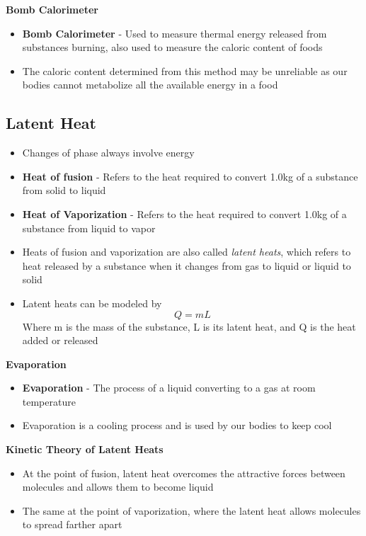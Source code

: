 \textbf{Bomb Calorimeter}
\begin{itemize}
    \item \textbf{Bomb Calorimeter} - Used to measure thermal energy released from substances burning, also used to measure the caloric content of foods
    \item The caloric content determined from this method may be unreliable as our bodies cannot metabolize all the available energy in a food
\end{itemize}

\subsection{Latent Heat}
\begin{itemize}
    \item Changes of phase always involve energy
    \item \textbf{Heat of fusion} - Refers to the heat required to convert 1.0kg of a substance from solid to liquid
    \item \textbf{Heat of Vaporization} - Refers to the heat required to convert 1.0kg of a substance from liquid to vapor
    \item Heats of fusion and vaporization are also called \emph{latent heats}, which refers to heat released by a substance when it changes from gas to liquid or liquid to solid
    \item Latent heats can be modeled by \[Q=mL\] Where m is the mass of the substance, L is its latent heat, and Q is the heat added or released
\end{itemize}

\textbf{Evaporation}
\begin{itemize}
    \item \textbf{Evaporation} - The process of a liquid converting to a gas at room temperature
    \item Evaporation is a cooling process and is used by our bodies to keep cool
\end{itemize}

\textbf{Kinetic Theory of Latent Heats}
\begin{itemize}
    \item At the point of fusion, latent heat overcomes the attractive forces between molecules and allows them to become liquid
    \item The same at the point of vaporization, where the latent heat allows molecules to spread farther apart
\end{itemize}

